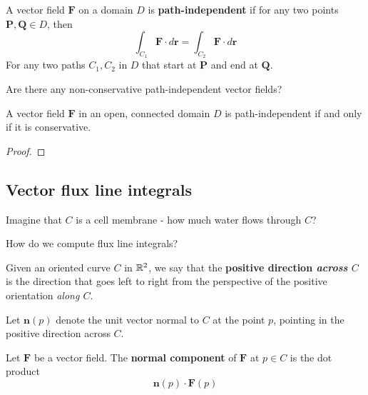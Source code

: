 \begin{definition}
    A vector field $\bm{F}$ on a domain $D$ is \textbf{path-independent} if for any two points $\bm{P}, \bm{Q} \in D$, then 
    $$\int_{C_1} \bm{F} \cdot d\bm{r} = \int_{C_2} \bm{F} \cdot d\bm{r}$$
    For any two paths $C_1, C_2$ in $D$ that start at $\bm{P}$ and end at $\bm{Q}$.
\end{definition}
    
    \begin{motivating}
        Are there any non-conservative path-independent vector fields?
    \end{motivating}
    
       
    \begin{theorem}
    A vector field $\bm{F}$ in an open, connected domain $D$ is path-independent if and only if it is conservative.
    \end{theorem}

    \begin{proof}
        
    \end{proof}


\subsection{Vector flux line integrals}

\begin{motivating}
    Imagine that $C$ is a cell membrane - how much water flows through $C$?
\end{motivating}

\begin{motivating}
    How do we compute flux line integrals?
\end{motivating}

\begin{definition}
    Given an oriented curve $C$ in $\mathbb{R}^2$, we say that the \textbf{positive direction \textit{across} $C$} is the direction that goes left to right from the perspective of the positive orientation \textit{along $C$}.
        
    
    
    Let $\bm{n}(p)$ denote the unit vector normal to $C$ at the point $p$, pointing in the positive direction across $C$.  
    
    \end{definition}

\begin{definition}
    Let $\bm{F}$ be a vector field.  The \textbf{normal component} of $\bm{F}$ at $p \in C$ is the dot product 
    $$\bm{n}(p) \cdot \bm{F}(p)$$
    
    \end{definition}


